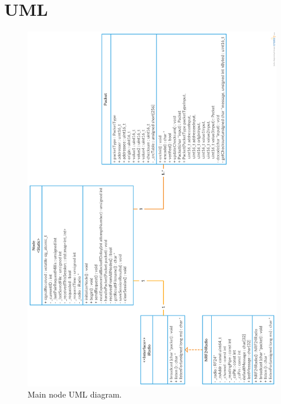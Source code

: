 \chapter{UML} \label{cha:fulluml}
\addtolength{\topmargin}{-.875in}
\begin{figure}[h!]
\centering
\includegraphics[width=1.1\textwidth]{chapters/appendix/MainNode_UML.png}
\caption{Main node UML diagram.}
\label{fig:mainuml}
\end{figure}
\clearpage
\addtolength{\topmargin}{-.875in}
